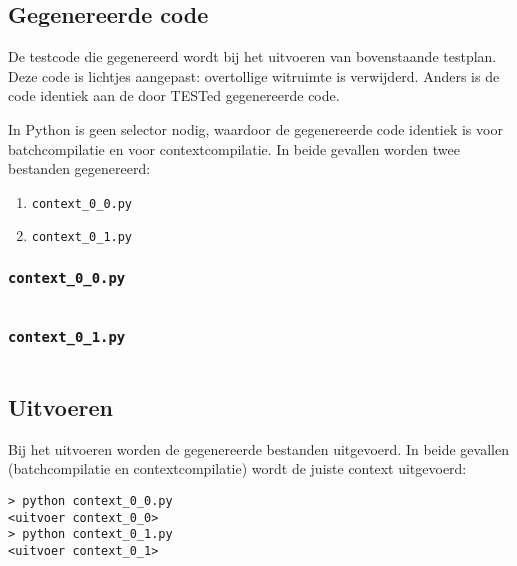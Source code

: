 \inputminted{python}{sources/echo/correct.py}

\subsection{Gegenereerde code}\label{subsec:echo-python-gegenereerde-code}

De testcode die gegenereerd wordt bij het uitvoeren van bovenstaande testplan.
Deze code is lichtjes aangepast: overtollige witruimte is verwijderd.
Anders is de code identiek aan de door TESTed gegenereerde code.

In Python is geen selector nodig, waardoor de gegenereerde code identiek is voor batchcompilatie en voor contextcompilatie.
In beide gevallen worden twee bestanden gegenereerd:

\begin{enumerate}
    \item \texttt{context\_0\_0.py}
    \item \texttt{context\_0\_1.py}
\end{enumerate}

\subsubsection{\texttt{context\_0\_0.py}}

\inputminted{python}{sources/echo/context_0_0.py}

\subsubsection{\texttt{context\_0\_1.py}}

\inputminted{python}{sources/echo/context_0_1.py}

\subsection{Uitvoeren}\label{subsec:echo-python-uitvoeren}

Bij het uitvoeren worden de gegenereerde bestanden uitgevoerd.
In beide gevallen (batchcompilatie en contextcompilatie) wordt de juiste context uitgevoerd:

\begin{verbatim}
> python context_0_0.py
<uitvoer context_0_0>
> python context_0_1.py
<uitvoer context_0_1>
\end{verbatim}

